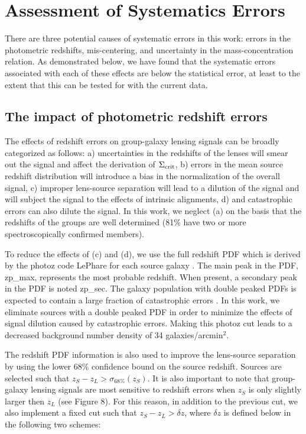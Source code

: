 \documentclass[12pt]{emulateapj}
\begin{document}
\section{Assessment of Systematics Errors}\label{syst_error}

There are three potential causes of systematic errors in this work:
errors in the photometric redshifts, mis-centering, and uncertainty in
the mass-concentration relation. As demonstrated below, we have found
that the systematic errors associated with each of these effects are
below the statistical error, at least to the extent that this can be
tested for with the current data.

\subsection{The impact of photometric redshift errors}

The effects of redshift errors on group-galaxy lensing signals can be
broadly categorized as follows: a) uncertainties in the redshifts of
the lenses will smear out the signal and affect the derivation of
$\Sigma_{\rm crit}$, b) errors in the mean source redshift
distribution will introduce a bias in the normalization of the overall
signal, c) improper lens-source separation will lead to a dilution of
the signal and will subject the signal to the effects of intrinsic
alignments, d) and catastrophic errors can also dilute the signal. In
this work, we neglect (a) on the basis that the redshifts of the
groups are well determined (81\% have two or more spectroscopically
confirmed members).

To reduce the effects of (c) and (d), we use the full redshift PDF
which is derived by the photoz code LePhare for each source galaxy
\citep[][]{Ilbert:2009}. The main peak in the PDF, {\sc zp\_max},
represents the most probable redshift. When present, a secondary peak
in the PDF is noted {\sc zp\_sec}. The galaxy population with double
peaked PDFs is expected to contain a large fraction of catastrophic
errors \citep[roughly 40\%-50\%,][]{Ilbert:2006,Ilbert:2009}. In this
work, we eliminate sources with a double peaked PDF in order to
minimize the effects of signal dilution caused by catastrophic
errors. Making this photoz cut leads to a decreased background number
density of 34 galaxies/arcmin$^2$.

The redshift PDF information is also used to improve the lens-source
separation by using the lower $68\%$ confidence bound on the source
redshift. Sources are selected such that $z_S-z_L>
\sigma_{68\%}(z_S)$. It is also important to note that group-galaxy
lensing signals are most sensitive to redshift errors when $z_S$ is
only slightly larger then $z_L$ (see Figure 8). For this reason, in
addition to the previous cut, we also implement a fixed cut such that
$z_S-z_L> \delta z$, where $\delta z$ is defined below in the following two
schemes:
\end{document}
